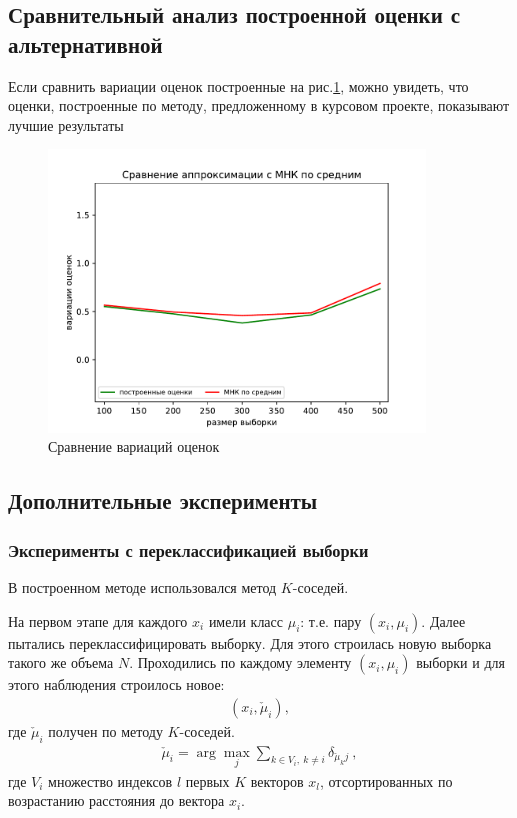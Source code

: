 \subsection{Сравнительный анализ построенной оценки с альтернативной}
Если сравнить вариации оценок построенные на рис.\ref{pic1}, можно увидеть, что оценки, построенные по методу, предложенному в курсовом проекте, показывают лучшие результаты
\begin{figure}[h!]
    \centering
    \includegraphics[width=100mm]{../images/OLS_GEM.pdf}
    \caption{Сравнение вариаций оценок\label{overflow}}
    \label{pic1}
\end{figure}

\newpage
\subsection{Дополнительные эксперименты}
\subsubsection{Эксперименты с переклассификацией выборки}
В построенном методе использовался метод $K$-соседей.

На первом этапе для каждого $x_i$ имели класс $\mu_i$: т.е. пару $(x_i,\mu_i)$.
Далее пытались переклассифицировать выборку. 
Для этого строилась новую выборка такого же объема $N$.
Проходились по каждому элементу $(x_i, \mu_i)$ выборки и для этого наблюдения строилось новое:
\begin{eqnarray}
    (x_i, \check{\mu}_i),
\end{eqnarray}
где $\check{\mu}_i$ получен по методу $K$-соседей.\hfill\break
\begin{eqnarray}
    \check{\mu}_i = \arg\max_j \sum_{k \in V_i,~k\neq i} \delta_{\check{\mu}_k j}~,
\end{eqnarray}
где $V_i$ множество индексов $l$ первых $K$ векторов $x_l$, отсортированных по возрастанию расстояния до вектора $x_i$.

